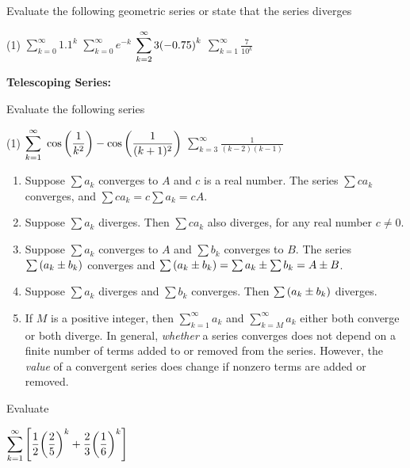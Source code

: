 \documentclass[../mathNotesPreamble]{subfiles}
\begin{document}
  \begin{ex*}
    Evaluate the following geometric series or state that the series diverges
  \end{ex*}
  \begin{tasks}[after-item-skip=\stretch{1}, label=,item-indent=0pt](1)
    \task $\displaystyle\sum_{k=0}^\infty 1.1^k$
    \task $\displaystyle\sum_{k=0}^\infty e^{-k}$
    \task $\displaystyle\sum_{k=2}^\infty 3{\left(-0.75\right)}^k$
    \task $\displaystyle\sum_{k=1}^\infty \frac{7}{10^k}$
  \end{tasks}
  \pagebreak

  \noindent \textbf{Telescoping Series:}

  \begin{ex*}
    Evaluate the following series
  \end{ex*}
  \begin{tasks}[after-item-skip=\stretch{1}, label=,item-indent=0pt](1)
    \task $\displaystyle\sum_{k=1}^\infty\ \cos\parens{\frac{1}{k^2}}-\cos\parens{\frac{1}{(k+1)^2}}$
    \task $\displaystyle\sum_{k=3}^\infty \frac{1}{(k-2)(k-1)}$
  \end{tasks}
  \pagebreak

  \begin{thmBox*}
    \begin{enumerate}
      \item Suppose $\sum a_k$ converges to $A$ and $c$ is a real number. The series $\sum ca_k$ converges, and $\sum ca_k=c\sum a_k=cA$.
      \item Suppose $\sum a_k$ diverges. Then $\sum ca_k$ also diverges, for any real number $c\neq 0$.
      \item Suppose $\sum a_k$ converges to $A$ and $\sum b_k$ converges to $B$. The series $\sum {\left(a_k\pm b_k\right)}$ converges and $\sum{\left(a_k\pm b_k\right)}=\sum a_k \pm \sum b_k=A\pm B$.
      \item Suppose $\sum a_k$ diverges and $\sum b_k$ converges. Then $\sum {\left(a_k\pm b_k\right)}$ diverges.
      \item If $M$ is a positive integer, then $\displaystyle \sum_{k=1}^\infty a_k$ and $\displaystyle\sum_{k=M}^\infty a_k$ either both converge or both diverge. In general, \textit{whether} a series converges does not depend on a finite number of terms added to or removed from the series. However, the \textit{value} of a convergent series does change if nonzero terms are added or removed.
    \end{enumerate}
  \end{thmBox*}

  \begin{ex*}
    Evaluate
  \end{ex*}
    $\displaystyle \sum_{k=1}^\infty {\left[\frac{1}{2}{\left(\frac{2}{5}\right)}^k+\frac{2}{3}{\left(\frac{1}{6}\right)}^k\right]}$
  \pagebreak
\end{document}
